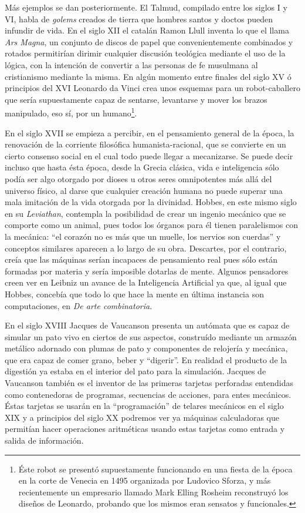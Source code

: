 \documentclass[12pt]{memoir}
\begin{document}
Más ejemplos se dan posteriormente. El Talmud, compilado entre los siglos I y VI, habla de \textit{golems} creados de tierra que hombres santos y doctos pueden infundir de vida. En el siglo XII el catalán Ramon Llull inventa lo que el llama \textit{Ars Magna}, un conjunto de discos de papel que convenientemente combinados y rotados permitirían dirimir cualquier discusión teológica mediante el uso de la lógica, con la intención de convertir a las personas de fe musulmana al cristianismo mediante la misma. En algún momento entre finales del siglo XV ó principios del XVI Leonardo da Vinci crea unos esquemas para un robot-caballero que sería supuestamente capaz de sentarse, levantarse y mover los brazos manipulado, eso sí, por un humano\footnote{Éste robot se presentó supuestamente funcionando en una fiesta de la época en la corte de Venecia en 1495 organizada por Ludovico Sforza, y más recientemente un empresario llamado Mark Elling Rosheim reconstruyó los diseños de Leonardo, probando que los mismos eran sensatos y funcionales.}. 

En el siglo XVII se empieza a percibir, en el pensamiento general de la época, la renovación de la corriente filosófica humanista-racional, que se convierte en un cierto consenso social en el cual todo puede llegar a mecanizarse. Se puede decir incluso que hasta ésta época, desde la Grecia clásica, vida e inteligencia sólo podía ser algo otorgado por dioses u otros seres omnipotentes más allá del universo físico, al darse que cualquier creación humana no puede superar una mala imitación de la vida otorgada por la divinidad. Hobbes, en este mismo siglo en su \textit{Leviathan}, contempla la posibilidad de crear un ingenio mecánico que se comporte como un animal, pues todos los órganos para él tienen paralelismos con la mecánica: ``el corazón no es más que un muelle, los nervios son cuerdas'' y conceptos similares aparecen a lo largo de su obra. Descartes, por el contrario, creía que las máquinas serían incapaces de pensamiento real pues sólo están formadas por materia y sería imposible dotarlas de mente. Algunos pensadores creen ver en Leibniz un avance de la Inteligencia Artificial ya que, al igual que Hobbes, concebía que todo lo que hace la mente en última instancia son computaciones, en \textit{De arte combinatoria}. 

En el siglo XVIII Jacques de Vaucanson presenta un autómata que es capaz de simular un pato vivo en ciertos de sus aspectos, construído mediante un armazón metálico adornado con plumas de pato y componentes de relojería y mecánica, que era capaz de comer grano, beber y ``digerir''. En realidad el producto de la digestión ya estaba en el interior del pato para la simulación. Jacques de Vaucanson también es el inventor de las primeras tarjetas perforadas entendidas como contenedoras de programas, secuencias de acciones, para entes mecánicos. Éstas tarjetas se usarán en la ``programación'' de telares mecánicos en el siglo XIX y a principios del siglo XX podremos ver ya máquinas calculadoras que permitían hacer operaciones aritméticas usando estas tarjetas como entrada y salida de información.
\end{document}
